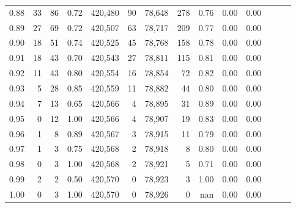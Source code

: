 \begin{tabular}{rrrrrrrrrrrrrr}
0.88 &      33 &     86 &  0.72 &  420,480 &       90 &  78,648 &     278 &  0.76 &  0.00 &      0.00 \\
0.89 &      27 &     69 &  0.72 &  420,507 &       63 &  78,717 &     209 &  0.77 &  0.00 &      0.00 \\
0.90 &      18 &     51 &  0.74 &  420,525 &       45 &  78,768 &     158 &  0.78 &  0.00 &      0.00 \\
0.91 &      18 &     43 &  0.70 &  420,543 &       27 &  78,811 &     115 &  0.81 &  0.00 &      0.00 \\
0.92 &      11 &     43 &  0.80 &  420,554 &       16 &  78,854 &      72 &  0.82 &  0.00 &      0.00 \\
0.93 &       5 &     28 &  0.85 &  420,559 &       11 &  78,882 &      44 &  0.80 &  0.00 &      0.00 \\
0.94 &       7 &     13 &  0.65 &  420,566 &        4 &  78,895 &      31 &  0.89 &  0.00 &      0.00 \\
0.95 &       0 &     12 &  1.00 &  420,566 &        4 &  78,907 &      19 &  0.83 &  0.00 &      0.00 \\
0.96 &       1 &      8 &  0.89 &  420,567 &        3 &  78,915 &      11 &  0.79 &  0.00 &      0.00 \\
0.97 &       1 &      3 &  0.75 &  420,568 &        2 &  78,918 &       8 &  0.80 &  0.00 &      0.00 \\
0.98 &       0 &      3 &  1.00 &  420,568 &        2 &  78,921 &       5 &  0.71 &  0.00 &      0.00 \\
0.99 &       2 &      2 &  0.50 &  420,570 &        0 &  78,923 &       3 &  1.00 &  0.00 &      0.00 \\
1.00 &       0 &      3 &  1.00 &  420,570 &        0 &  78,926 &       0 &   nan &  0.00 &      0.00 \\
\bottomrule
\end{tabular}
